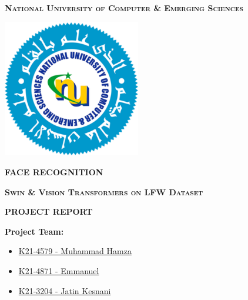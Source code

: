\documentclass[twocolumn]{IEEEtran}
\begin{document}
\begin{titlepage}
    \centering
    

    {\scshape\Huge \textbf{National University of Computer \& Emerging Sciences} \par}
    \vspace{10pt}
    
    \includegraphics[width=0.45\textwidth]{FAST-NUCES-Logo.png}\par
    \vspace{10pt}
    
    {\scshape\Huge \textbf{FACE RECOGNITION} \par}
    
    {\scshape\LARGE \textbf{Swin \& Vision Transformers on LFW Dataset} \par}
    \vspace{10pt}
    
    {\scshape\LARGE \textbf{PROJECT REPORT} \par}
    \vspace{10pt}
    
    \begin{flushleft}
        \Large
        \noindent\textbf{Project Team:}
        \vspace{10pt}
        \begin{itemize}
            \item \href{https://github.com/muhammadhamzagova666/}{K21-4579 - Muhammad Hamza}
            \vspace{10pt}
            \item \href{https://github.com/emmanuelmoon/}{K21-4871 - Emmanuel}
            \vspace{10pt}
            \item \href{https://github.com/Jatin-Kesnani/}{K21-3204 - Jatin Kesnani}
        \end{itemize}
        \vspace{10pt}


\end{flushleft}
\end{titlepage}
\end{document}

